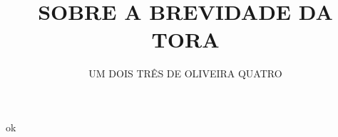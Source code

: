 \documentclass{imetex-pfc}
\author{UM DOIS TRÊS DE OLIVEIRA QUATRO}
\title{SOBRE A BREVIDADE DA TORA}
\date{\the\year}
\begin{document}
 \makeall

ok
\end{document}
